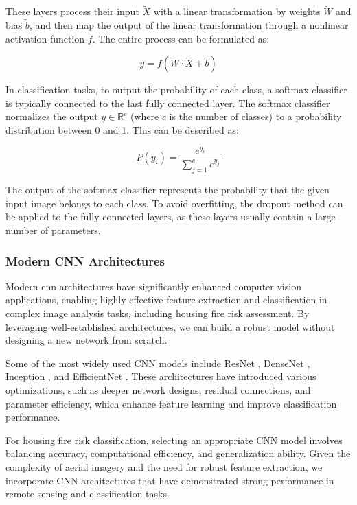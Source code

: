 These layers process their input \( \tilde{X} \) with
a linear transformation by weights \( \tilde{W} \) and bias \( \tilde{b} \), and then
map the output of the linear transformation through a nonlinear activation function \( f \).
The entire process can be formulated as:

\begin{equation}
    y = f(\tilde{W} \cdot \tilde{X} + \tilde{b})
    \label{eq:fully-connected}
\end{equation}

In classification tasks, to output the probability of each class, a softmax classifier
is typically connected to the last fully connected layer. The softmax classifier
normalizes the output \( y \in \mathbb{R}^c \) (where \( c \) is the number of classes)
to a probability distribution between 0 and 1. This can be described as:

\begin{equation}
    P(y_i) = \frac{e^{y_i}}{\sum_{j=1}^{c} e^{y_j}}
    \label{eq:softmax}
\end{equation}

The output of the softmax classifier represents the probability that the given input
image belongs to each class. To avoid overfitting, the dropout method can be applied
to the fully connected layers, as these layers usually contain a large number of
parameters.


\subsubsection{Modern CNN Architectures}
Modern \gls{cnn} architectures have significantly enhanced computer vision applications, enabling 
highly effective feature extraction and classification in complex image analysis tasks, including 
housing fire risk assessment. By leveraging well-established architectures, we can build a robust model 
without designing a new network from scratch.

Some of the most widely used CNN models include ResNet \cite{he2016deep}, DenseNet \cite{huang2017densely}, 
Inception \cite{szegedy2015going}, and EfficientNet \cite{efficientnet}. These architectures have introduced 
various optimizations, such as deeper network designs, residual connections, and parameter efficiency, 
which enhance feature learning and improve classification performance.

For housing fire risk classification, selecting an appropriate CNN model involves balancing accuracy, computational 
efficiency, and generalization ability. Given the complexity of aerial imagery and the need for robust 
feature extraction, we incorporate CNN architectures that have demonstrated strong performance in 
remote sensing and classification tasks.

